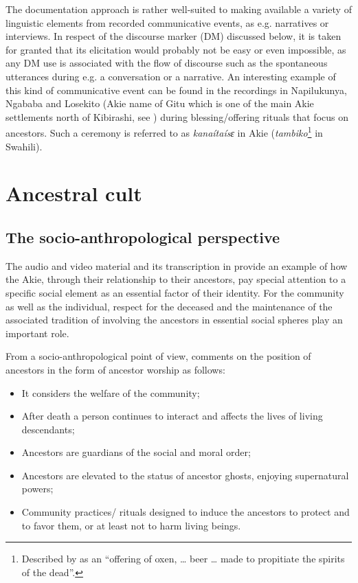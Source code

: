 \documentclass[output=paper,colorlinks,citecolor=brown]{langscibook}
\begin{document}
The documentation approach is rather well-suited to making available a variety of linguistic elements from recorded communicative events, as e.g. narratives or interviews. In respect of the discourse marker (DM) discussed below, it is taken for granted that its elicitation would probably not be easy or even impossible, as any DM use is associated with the flow of discourse such as the spontaneous utterances during e.g. a conversation or a narrative. An interesting example of this kind of communicative event can be found in the recordings in Napilukunya, Ngababa and Losekito (Akie name of Gitu which is one of the main Akie settlements north of Kibirashi, see ) during blessing/offering rituals that focus on  ancestors. Such a ceremony is referred to as \textit{kanaítaísɛ} in Akie (\textit{tambiko}\footnote{Described by \cite[449]{Johnson1939} as an “offering of oxen, … beer … made to propitiate the spirits of the dead”.} in Swahili). 

\section{Ancestral cult}\label{sec:legere:3}

\subsection{The socio-anthropological perspective}\label{sec:legere:3.1}

The audio and video material and its transcription in  provide an example of how the Akie, through their relationship to their ancestors, pay special attention to a specific social element as an essential factor of their identity. For the community as well as the individual, respect for the deceased and the maintenance of the associated tradition of involving the ancestors in essential social spheres play an important role. 

From a socio-anthropological point of view, \cite[364]{Ferraro2005} comments on the position of ancestors in the form of ancestor worship as follows:

\begin{itemize}
    \item It considers the welfare of the community;
    \item After death a person continues to interact and affects the lives of living descendants;
    \item Ancestors are guardians of the social and moral order;
    \item Ancestors are elevated to the status of ancestor ghosts, enjoying supernatural powers;
    \item Community practices/ rituals designed to induce the ancestors to protect and to favor them, or at least not to harm living beings.
\end{itemize}
\end{document}

